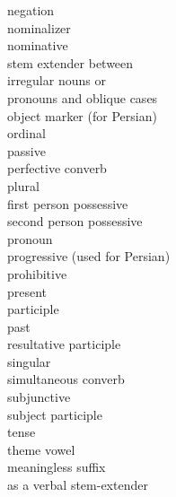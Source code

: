 \begin{multicols}{2}
\begin{tabbing}
	{\neggloss}	\> negation   \\
	{\nmlz} \> nominalizer \\
	{\nom}  \> nominative \\
	{\nx}   \> stem extender between \\
            \> irregular nouns or\\ 
			\> pronouns and oblique cases\\
	{\om}	\> object marker (for Persian)\\
	{\ord}	\> ordinal \\
	{\pass}	\> passive \\
	{\perfcvb}  \> 	perfective converb  \\
	{\pl}       \> 	plural  \\ 
	{\possFsg}	\>   first person possessive \\
	{\possSsg} 	\>   second person possessive\\
	{\pro}   \> 	pronoun\\
	{\prog}	 \> progressive (used for Persian) \\
	{\proh}	  \> prohibitive \\
	{\prs}    \> 	present  \\
	{\ptcp}	  \> participle\\ %
	{\pst}    \> 	past \\
	{\rptcp}  \> resultative participle \\
	{\sg}     \> 	singular\\
	{\simcvb} \>  simultaneous converb \\
	{\subj}	  \> subjunctive   \\ %
	{\sptcp}  \> 	subject participle  \\
	{\tense}  \> 	tense  \\
	{\thgloss} \> 	theme vowel \\
	{\vx}	   \> meaningless suffix \\ \> as a verbal stem-extender
\end{tabbing}
\end{multicols}
